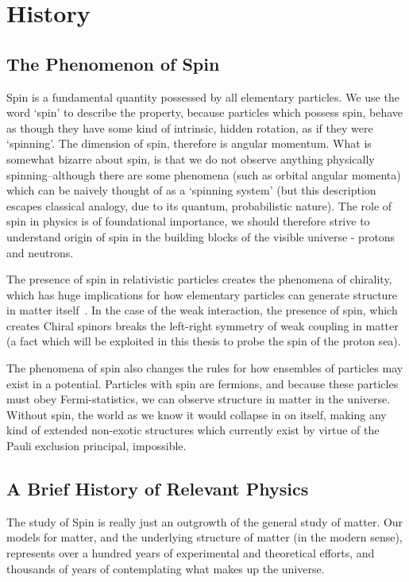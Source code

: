 \chapter{History}
\section{The Phenomenon of Spin}

Spin is a fundamental quantity possessed by all elementary particles. We use the
word `spin' to describe the property, because particles which possess spin,
behave as though they have some kind of intrinsic, hidden rotation, as if they
were `spinning'. The dimension of spin, therefore is angular momentum. What is
somewhat bizarre about spin, is that we do not observe anything physically
spinning--although there are some phenomena (such as orbital angular momenta)
which can be naively thought of as a `spinning system' (but this description
escapes classical analogy, due to its quantum, probabilistic nature). The role
of spin in physics is of foundational importance, we should therefore strive to
understand origin of spin in the building blocks of the visible universe -
protons and neutrons.

The presence of spin in relativistic particles creates the phenomena of
chirality, which has huge implications for how elementary particles can generate
structure in matter itself~\cite{Brodsky1988}. In the case of the weak
interaction, the presence of spin, which creates Chiral spinors breaks the
left-right symmetry of weak coupling in matter (a fact which will be exploited
in this thesis to probe the spin of the proton sea).

The phenomena of spin also changes the rules for how ensembles of particles may
exist in a potential. Particles with spin are fermions, and because these
particles must obey Fermi-statistics, we can observe structure in matter in the
universe. Without spin, the world as we know it would collapse in on itself,
making any kind of extended non-exotic structures which currently exist by
virtue of the Pauli exclusion principal, impossible.

\clearpage
\section{A Brief History of Relevant Physics}

The study of Spin is really just an outgrowth of the general study of matter.
Our models for matter, and the underlying structure of matter (in the modern
sense), represents over a hundred years of experimental and theoretical efforts,
and thousands of years of contemplating what makes up the universe.

